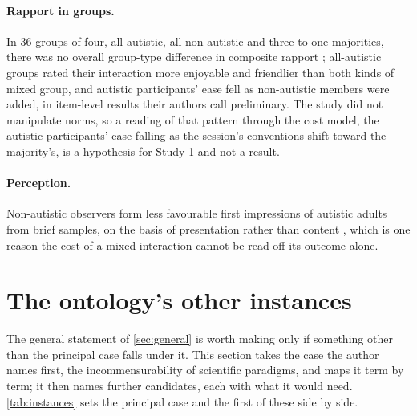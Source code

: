 \paragraph{Rapport in groups.} In $36$ groups of four, all-autistic, all-non-autistic and three-to-one majorities, there was no overall group-type difference in composite rapport \cite{Foster2025}; all-autistic groups rated their interaction more enjoyable and friendlier than both kinds of mixed group, and autistic participants' ease fell as non-autistic members were added, in item-level results their authors call preliminary. The study did not manipulate norms, so a reading of that pattern through the cost model, the autistic participants' ease falling as the session's conventions shift toward the majority's, is a hypothesis for Study 1 and not a result.

\paragraph{Perception.} Non-autistic observers form less favourable first impressions of autistic adults from brief samples, on the basis of presentation rather than content \cite{Sasson2017}, which is one reason the cost of a mixed interaction cannot be read off its outcome alone.

\section{The ontology's other instances}
\label{sec:instances}

The general statement of \autoref{sec:general} is worth making only if something other than the principal case falls under it. This section takes the case the author names first, the incommensurability of scientific paradigms, and maps it term by term; it then names further candidates, each with what it would need. \autoref{tab:instances} sets the principal case and the first of these side by side.

